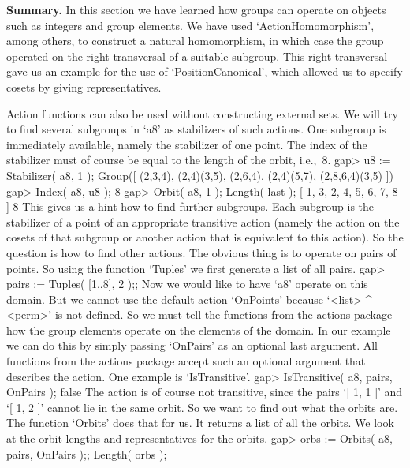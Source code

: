{\bf Summary.} In this section we have learned  how groups can operate on
{\GAP}   objects such as  integers  and   group  elements.  We  have used
`ActionHomomorphism',    among   others,   to   construct   a  natural
homomorphism,  in which case the  group operated on the right transversal
of a suitable subgroup. This right transversal gave us an example for the
use of `PositionCanonical', which allowed  us to specify cosets by giving
representatives.


Action functions can also be  used without constructing external sets.
We will try to   find several subgroups  in `a8'  as stabilizers of  such
actions. One subgroup is immediately  available, namely the stabilizer
of one point. The index of the stabilizer must of course  be equal to the
length of the orbit, i.e.,~8.
\beginexample
gap> u8 := Stabilizer( a8, 1 );
Group([ (2,3,4), (2,4)(3,5), (2,6,4), (2,4)(5,7), (2,8,6,4)(3,5) ])
gap> Index( a8, u8 );
8
gap> Orbit( a8, 1 ); Length( last );
[ 1, 3, 2, 4, 5, 6, 7, 8 ]
8
\endexample
This gives us a hint how to find further  subgroups. Each subgroup is the
stabilizer of a point of an appropriate  transitive action (namely the
action  on  the cosets of that  subgroup  or another action that is
equivalent to  this action).  So the question   is how  to find  other
actions. The obvious thing is to operate  on pairs of points. So using
the function `Tuples' we first generate a list of all pairs.
\beginexample
gap> pairs := Tuples( [1..8], 2 );;
\endexample
Now we would like to have `a8' operate on this  domain. But we cannot use
the  default action `OnPoints'  because    `<list> ^ <perm>' is    not
defined. So we  must tell the functions  from the actions package  how
the group elements operate on the elements of  the domain. In our example
we can do this by simply passing `OnPairs' as an optional last argument.
All functions from the actions package accept such an optional argument
that describes the action. One example is `IsTransitive'.
\beginexample
gap> IsTransitive( a8, pairs, OnPairs );
false
\endexample
The action is of course not transitive, since the pairs `[ 1, 1 ]' and
`[ 1, 2 ]' cannot lie in the same orbit.
So we want to  find out what the orbits are.
The function `Orbits' does that for us.
It returns a list of all the orbits.
We look at the orbit lengths and representatives for the orbits.
\beginexample
gap> orbs := Orbits( a8, pairs, OnPairs );; Length( orbs );
